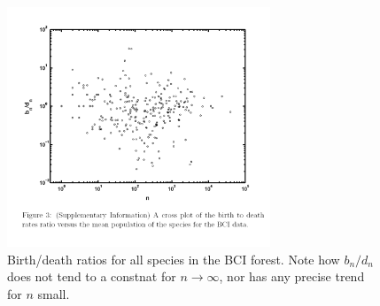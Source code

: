 \documentclass[../../main.tex]{subfiles}
\begin{document}
\begin{figure}[H]
    \centering
    \includegraphics[width=0.7\textwidth]{density-real.png}
    \caption{Birth/death ratios for all species in the BCI forest. Note how $b_n/d_n$ does not tend to a constnat for $n \to \infty$, nor has any precise trend for $n$ small.}
    \label{fig:density-real}
\end{figure}


\end{document}
